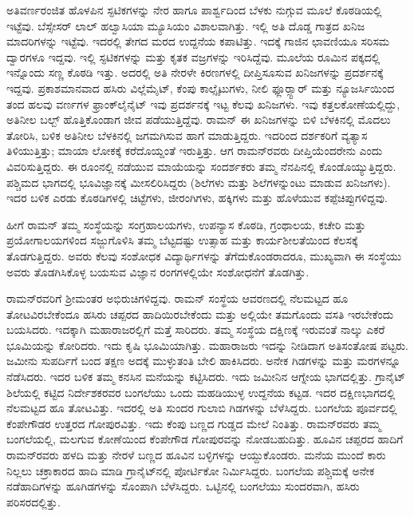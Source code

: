 ಅತಿವರ್ಣರಂಜಿತ ಹೊಳಪಿನ ಸ್ಫಟಿಕಗಳನ್ನು ನೇರ ಹಾಗೂ ಪಾರ್ಶ್ವದಿಂದ ಬೆಳಕು ನುಗ್ಗುವ ಮೂಲೆ ಕೊಠಡಿಯಲ್ಲಿ ಇಟ್ಟೆವು. ಬೆಸ್ಸೇಸರ್ ಲಾಲ್ ಹಲ್ವಾಸಿಯಾ ಮ್ಯೂಸಿಯಂ ವಿಶಾಲವಾಗಿತ್ತು. ಇಲ್ಲಿ ಅತಿ ದೊಡ್ಡ ಗಾತ್ರದ ಖನಿಜ ಮಾದರಿಗಳನ್ನು ಇಟ್ಟೆವು. ಇದರಲ್ಲಿ ತೇಗದ ಮರದ ಉದ್ದನೆಯ ಕಪಾಟಿತ್ತು. ಇದಕ್ಕೆ ಗಾಜಿನ ಛಾವಣಿಯೂ ಸರಿಸಮ ದ್ವಾರಗಳೂ ಇದ್ದವು. ಇಲ್ಲಿ ಸ್ಫಟಿಕಗಳನ್ನು ಮತ್ತು ಕೃತಕ ವಜ್ರಗಳನ್ನು ಇರಿಸಿದ್ದೆವು. ಮೂಲೆಯ ರೂಮಿನ ಪಕ್ಕದಲ್ಲಿ ಇನ್ನೊಂದು ಸಣ್ಣ ಕೊಠಡಿ ಇತ್ತು. ಅದರಲ್ಲಿ ಅತಿ ನೇರಳೇ ಕಿರಣಗಳಲ್ಲಿ ದೀಪ್ತಿಸೂಸುವ ಖನಿಜಗಳನ್ನು ಪ್ರದರ್ಶನಕ್ಕೆ ಇದ್ದವು. ಪ್ರಕಾಶಮಾನವಾದ ಹಸಿರು ವಿಲ್ಲೆಮೈಟ್, ಕೆಂಪು ಕಾಲ್ಸೈಟುಗಳು, ನೀಲಿ ಫ್ಲೂರ್‍ಸ್ಟಾರ್ ಮತ್ತು ನ್ಯೂಜರ್ಸಿಯಿಂದ ತಂದ ಹಲವು ವರ್ಣಗಳ ಫ್ರಾಂಕ್‍ಲೈನೈಟ್ ಇವು ಪ್ರದರ್ಶನಕ್ಕೆ ಇಟ್ಟ ಕೆಲವು ಖನಿಜಗಳು. ಇವು ಕತ್ತಲಕೋಣೆಯಲ್ಲಿದ್ದು, ಅತಿನೀಲ ಬಲ್ಬ್ ಹೊತ್ತಿಕೊಂಡಾಗ ಜೀವ ಪಡೆಯುತ್ತಿದ್ದೆವು. ರಾಮನ್ ಈ ಖನಿಜಗಳನ್ನು ಬಿಳಿ ಬೆಳಕಿನಲ್ಲಿ ಮೊದಲು ತೋರಿಸಿ, ಬಳಿಕ ಅತಿನೀಲ ಬೆಳಕಿನಲ್ಲಿ ಜಗಮಗಿಸುವ ಹಾಗೆ ಮಾಡುತ್ತಿದ್ದರು. ಇದರಿಂದ ದರ್ಶಕರಿಗೆ ವ್ಯತ್ಯಾಸ ತಿಳಿಯುತ್ತಿತ್ತು; ಮಾಯಾ ಲೋಕಕ್ಕೆ ಕರೆದೊಯ್ದಂತೆ ಇರುತ್ತಿತ್ತು. ಆಗ ರಾಮನ್‍ರವರು ದೀಪ್ತಿಯೆಂದರೇನು ಎಂದು ವಿವರಿಸುತ್ತಿದ್ದರು. ಈ ರೂಂನಲ್ಲಿ ನಡೆಯುವ ಮಾಯೆಯನ್ನು ಸಂದರ್ಶಕರು ತಮ್ಮ ನೆನಪಿನಲ್ಲಿ ಕೊಂಡೊಯ್ಯುತ್ತಿದ್ದರು. ಪಶ್ಚಿಮದ ಭಾಗದಲ್ಲಿ ಭೂವಿಜ್ಞಾನಕ್ಕೆ ಮೀಸಲಿರಿಸಿದ್ದರು (ಶಿಲೆಗಳು ಮತ್ತು ಶಿಲೆಗಳನ್ನುಂಟು ಮಾಡುವ ಖನಿಜಗಳು). ಇದರ ಬಳಿಕ ಎರಡು ಕೊಠಡಿಗಳಲ್ಲಿ ಚಿಟ್ಟೆಗಳು, ಜೀರಂಗಿಗಳು, ಹಕ್ಕಿಗಳು ಮತ್ತು ಹೊಳೆಯುವ ಕಪ್ಪೆಚಿಪ್ಪುಗಳಿದ್ದವು.

ಹೀಗೆ ರಾಮನ್ ತಮ್ಮ ಸಂಸ್ಥೆಯನ್ನು ಸಂಗ್ರಹಾಲಯಗಳು, ಉಪನ್ಯಾಸ ಕೊಠಡಿ, ಗ್ರಂಥಾಲಯ, ಕಚೇರಿ ಮತ್ತು ಪ್ರಯೋಗಾಲಯಗಳಿಂದ ಸಜ್ಜುಗೊಳಿಸಿ ತಮ್ಮ ಬೆಟ್ಟದಷ್ಟು ಉತ್ಸಾಹ ಮತ್ತು ಕಾರ್ಯಶೀಲತೆಯಿಂದ ಕೆಲಸಕ್ಕೆ ತೊಡಗುತ್ತಿದ್ದರು. ಅವರು ಕೆಲವು ಸಂಶೋಧಕ ವಿದ್ಯಾರ್ಥಿಗಳನ್ನು ತೆಗೆದುಕೊಂಡರಾದರೂ, ಮುಖ್ಯವಾಗಿ ಈ ಸಂಸ್ಥೆಯು ಅವರು ತೊಡಗಿಸಿಕೊಳ್ಳ ಬಯಸುವ ವಿಜ್ಞಾನ ರಂಗಗಳಲ್ಲಿಯೇ ಸಂಶೋಧನೆಗೆ ತೊಡಗಿತ್ತು.

ರಾಮನ್‍ರವರಿಗೆ ಶ‍್ರೀಮಂತರ ಅಭಿರುಚಿಗಳಿದ್ದವು. ರಾಮನ್ ಸಂಸ್ಥೆಯ ಆವರಣದಲ್ಲಿ ನೆಲಮಟ್ಟದ ಹೂ ತೋಟವಿರಬೇಕೆಂದೂ ಹಸಿರು ಚಪ್ಪರದ ಹಾದಿಯಿರಬೇಕೆಂದು ಮತ್ತು ಅಲ್ಲಿಯೇ ತಮಗೊಂದು ವಸತಿ ಇರಬೇಕೆಂದು ಬಯಸಿದರು. ಇದಕ್ಕಾಗಿ ಮಹಾರಾಜರಲ್ಲಿಗೆ ಮತ್ತೆ ಸಾರಿದರು. ತಮ್ಮ ಸಂಸ್ಥೆಯ ದಕ್ಷಿಣಕ್ಕೆ ಇರುವಂತೆ ನಾಲ್ಕು ಎಕರೆ ಭೂಮಿಯನ್ನು ಕೋರಿದರು. ಇದು ಕೃಷಿ ಭೂಮಿಯಾಗಿತ್ತು. ಮಹಾರಾಜರು ಇದನ್ನು ನೀಡಿದಾಗ ಅತಿಸಂತೋಷ ಪಟ್ಟರು. ಜಮೀನು ಸುಪರ್ದಿಗೆ ಬಂದ ತಕ್ಷಣ ಅದಕ್ಕೆ ಮುಳ್ಳುತಂತಿ ಬೇಲಿ ಹಾಕಿಸಿದರು. ಅನೇಕ ಗಿಡಗಳನ್ನು ಮತ್ತು ಮರಗಳನ್ನೂ ನೆಡೆಸಿದರು. ಇದರ ಬಳಿಕ ತಮ್ಮ ಕನಸಿನ ಮನೆಯನ್ನು ಕಟ್ಟಿಸಿದರು. ಇದು ಜಮೀನಿನ ಆಗ್ನೇಯ ಭಾಗದಲ್ಲಿತ್ತು. ಗ್ರಾನೈಟ್ ಶಿಲೆಯಲ್ಲಿ ಕಟ್ಟಿದ ನಿರ್ದೇಶಕರವರ ಬಂಗಲೆಯು ಒಂದು ಮಹಡಿಯುಳ್ಳ ಉದ್ದನೆಯ ಕಟ್ಟಡ. ಇದರ ದಕ್ಷಿಣಭಾಗದಲ್ಲಿ ನೆಲಮಟ್ಟದ ಹೂ ತೋಟವಿತ್ತು. ಇದರಲ್ಲಿ ಅತಿ ಸುಂದರ ಗುಲಾಬಿ ಗಿಡಗಳನ್ನು ಬೆಳೆಸಿದ್ದರು. ಬಂಗಲೆಯ ಪೂರ್ವದಲ್ಲಿ ಕೆಂಪೇಗೌಡರ ಉತ್ತರದ ಗೋಪುರವಿತ್ತು. ಇದು ಕೆಂಪು ಬಣ್ಣದ ಗುಡ್ಡದ ಮೇಲೆ ನಿಂತಿತ್ತು. ರಾಮನ್‍ರವರು ತಮ್ಮ ಬಂಗಲೆಯಲ್ಲಿ, ಮಲಗುವ ಕೋಣೆಯಿಂದ ಕೆಂಪೇಗೌಡ ಗೋಪುರವನ್ನು ನೋಡಬಹುದಿತ್ತು. ಹೂವಿನ ಚಪ್ಪರದ ಹಾದಿಗೆ ರಾಮನ್‍ರವರು ಹಳದಿ ಮತ್ತು ನೇರಳೆ ಬಣ್ಣದ ಹೂವಿನ ಬಳ್ಳಿಗಳನ್ನು ಆಯ್ದುಕೊಂಡರು. ಮನೆಯ ಮುಂದೆ ಕಾರು ನಿಲ್ಲಲು ಚಕ್ರಾಕಾರದ ಹಾದಿ ಮಾಡಿ ಗ್ರಾನೈಟ್‍ನಲ್ಲಿ ಪೋರ್ಟಿಕೋ ನಿರ್ಮಿಸಿದ್ದರು. ಬಂಗಲೆಯ ಪಶ್ಚಿಮಕ್ಕೆ ಅನೇಕ ನಡೆಹಾದಿಗಳನ್ನು ಹೂಗಿಡಗಳನ್ನು ಸೊಂಪಾಗಿ ಬೆಳೆಸಿದ್ದರು. ಒಟ್ಟಿನಲ್ಲಿ ಬಂಗಲೆಯು ಸುಂದರವಾಗಿ, ಹಸಿರು ಪರಿಸರದಲ್ಲಿತ್ತು.

